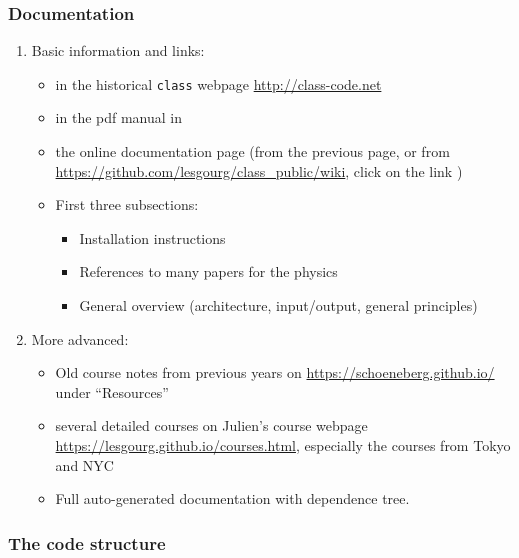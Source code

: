 \begin{frame}[fragile]
	\frametitle{Documentation}
\begin{enumerate}
	\item Basic information and links:\pause
	\begin{itemize}
		\item
		{\scriptsize in the historical {\tt \Red class} webpage \url{http://class-code.net}}\pause
		\item
		{\scriptsize in the pdf manual in } \pause
		\item {\scriptsize the online documentation page (from the previous page, or from \url{https://github.com/lesgourg/class_public/wiki}, click on the link {\tt {}})}
		\item {\scriptsize First three subsections: }
		\begin{itemize}\item {\scriptsize Installation instructions}
			\item {\scriptsize References to many papers for the physics}
			\item {\scriptsize General overview (architecture, input/output, general principles)}
		\end{itemize}
	\end{itemize}
	\pause
	\item More advanced:
	\begin{itemize}
		\item {\scriptsize Old course notes from previous years on \url{https://schoeneberg.github.io/} under ``Resources''}
		\item {\scriptsize several detailed courses on Julien's course webpage \url{https://lesgourg.github.io/courses.html}, especially the courses from Tokyo and NYC}
		\item {\scriptsize Full auto-generated documentation with dependence tree.}
	\end{itemize}
\end{enumerate}
\end{frame}

\begin{frame}[fragile]
	\frametitle{The code structure}


\end{frame}


